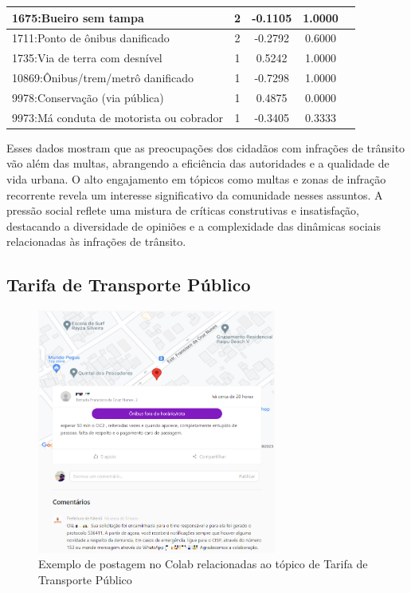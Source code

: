 \begin{table}[htbp]
\begin{tabular}{|l|c|c|c|c|}
		\hline
		1675:Bueiro sem tampa                             & 2                & -0.1105        & 1.0000           \\
		\hline
		1711:Ponto de ônibus danificado                   & 2                & -0.2792        & 0.6000           \\
		\hline
		1735:Via de terra com desnível                    & 1                & 0.5242         & 1.0000           \\
		\hline
		10869:Ônibus/trem/metrô danificado                & 1                & -0.7298        & 1.0000           \\
		\hline
		9978:Conservação (via pública)                    & 1                & 0.4875         & 0.0000           \\
		\hline
		9973:Má conduta de motorista ou cobrador          & 1                & -0.3405        & 0.3333           \\
		\hline
	\end{tabular}
\end{table}

Esses dados mostram que as preocupações dos cidadãos com infrações de trânsito vão além das multas, abrangendo a eficiência das autoridades e a qualidade de vida urbana. O alto engajamento em tópicos como multas e zonas de infração recorrente revela um interesse significativo da comunidade nesses assuntos. A pressão social reflete uma mistura de críticas construtivas e insatisfação, destacando a diversidade de opiniões e a complexidade das dinâmicas sociais relacionadas às infrações de trânsito.

\subsection{Tarifa de Transporte Público}

\begin{figure}[htb]
	\centering
	\includegraphics[width=0.7\textwidth]{images/colab_posts_busfare.png}
	\caption{Exemplo de postagem no Colab relacionadas ao tópico de Tarifa de Transporte Público}
	\label{fig:colab_posts_busfare}
\end{figure}

